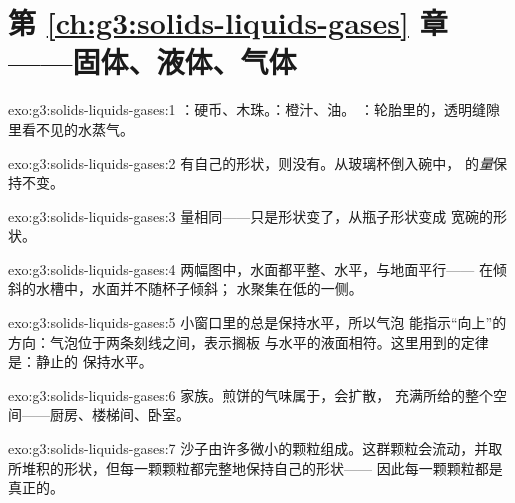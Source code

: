 \section*{第 \ref{ch:g3:solids-liquids-gases} 章——固体、液体、气体}

\begin{solution}{exo:g3:solids-liquids-gases:1}
：硬币、木珠。：橙汁、油。
：轮胎里的，透明缝隙里看不见的水蒸气。
\end{solution}

\begin{solution}{exo:g3:solids-liquids-gases:2}
有自己的形状，则没有。从玻璃杯倒入碗中，
的\emph{量}保持不变。
\end{solution}

\begin{solution}{exo:g3:solids-liquids-gases:3}
量相同——只是形状变了，从瓶子形状变成
宽碗的形状。
\end{solution}

\begin{solution}{exo:g3:solids-liquids-gases:4}
两幅图中，水面都平整、水平，与地面平行——
在倾斜的水槽中，水面并不随杯子倾斜；
水聚集在低的一侧。
\end{solution}

\begin{solution}{exo:g3:solids-liquids-gases:5}
小窗口里的总是保持水平，所以气泡
能指示“向上”的方向：气泡位于两条刻线之间，表示搁板
与水平的液面相符。这里用到的定律是：静止的
保持水平。
\end{solution}

\begin{solution}{exo:g3:solids-liquids-gases:6}
家族。煎饼的气味属于，会扩散，
充满所给的整个空间——厨房、楼梯间、卧室。
\end{solution}

\begin{solution}{exo:g3:solids-liquids-gases:7}
沙子由许多微小的颗粒组成。这群颗粒会流动，并取
所堆积的形状，但每一颗颗粒都完整地保持自己的形状——
因此每一颗颗粒都是真正的。
\end{solution}

